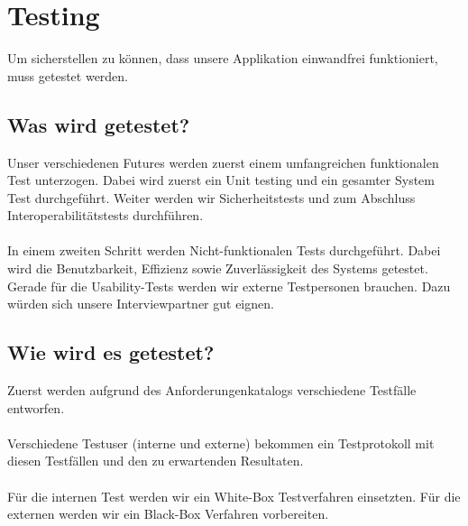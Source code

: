 \chapter{Testing}

Um sicherstellen zu können, dass unsere Applikation einwandfrei funktioniert, muss getestet werden.

\section{Was wird getestet?}

Unser verschiedenen Futures werden zuerst einem umfangreichen funktionalen Test unterzogen. Dabei wird zuerst ein Unit testing und ein gesamter System Test durchgeführt. Weiter werden wir Sicherheitstests und zum Abschluss Interoperabilitätstests durchführen. \\ \\
In einem zweiten Schritt werden Nicht-funktionalen Tests durchgeführt. Dabei wird die Benutzbarkeit, Effizienz sowie Zuverlässigkeit des Systems getestet. Gerade für die Usability-Tests werden wir externe Testpersonen brauchen. Dazu würden sich unsere Interviewpartner gut eignen.

\section{Wie wird es getestet?}

Zuerst werden aufgrund des Anforderungenkatalogs verschiedene Testfälle entworfen. \\ \\
Verschiedene Testuser (interne und externe) bekommen ein Testprotokoll mit diesen Testfällen und den zu erwartenden Resultaten. \\ \\ 
Für die internen Test werden wir ein White-Box Testverfahren einsetzten. Für die externen werden wir ein Black-Box Verfahren vorbereiten.
